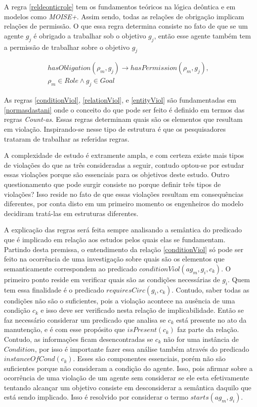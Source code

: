 A regra \ref{reldeonticrole} tem os fundamentos teóricos na lógica deôntica e em modelos como \textit{MOISE+}. Assim sendo, todas as relações de obrigação implicam relações de permissão. O que essa regra determina consiste no fato de que se um agente $g_j$ é obrigado a trabalhar sob o objetivo $g_j$, então esse agente também tem a permissão de trabalhar sobre o objetivo $g_j$ 

\begin{eqnarray}\label{reldeonticrole}
	hasObligation(\rho_m,g_j) \to hasPermission(\rho_m,g_j), \nonumber \\
    \rho_m \in Role \wedge g_j \in Goal
\end{eqnarray}

As regras \ref{conditionViol}, \ref{relationViol}, e \ref{entityViol} são fundamentadas em \ref{normasdastani} onde o conceito do que pode ser feito é definido em termos das regras \textit{Count-as}. Essas regras determinam quais são os elementos que resultam em violação. Inspirando-se nesse tipo de estrutura é que os pesquisadores trataram de trabalhar as referidas regras. 

A complexidade de estudo é extramente ampla, e com certeza existe mais tipos de violações do que as três consideradas a seguir, contudo optou-se por estudar essas violações porque são essenciais para os objetivos deste estudo. Outro questionamento que pode surgir consiste no porque definir três tipos de violações? Isso reside no fato de que essas violações resultam em consequências diferentes, por conta disto em um primeiro momento os engenheiros do modelo decidiram tratá-las em estruturas diferentes. 

A explicação das regras será feita sempre analisando a semântica do predicado que é implicado em relação aos estudos pelos quais elas se fundamentam. Partindo desta premissa, o entendimento da relação \ref{conditionViol} só pode ser feito na ocorrência de uma  investigação sobre quais são os elementos que semanticamente correspondem ao predicado $conditionViol(ag_m,g_i,c_k)$. O primeiro ponto reside em verificar quais são as condições necessárias de $g_i$. Quem tem essa finalidade é o predicado $requiresCirc(g_i,c_k)$. Contudo, saber todas as condições não são o suficientes, pois a violação acontece na ausência de uma condição $c_k$ e isso deve ser verificado nesta relação de implicabilidade. Então se faz necessário considerar um predicado que analisa se $c_k$ está presente no ato da manutenção, e é com esse propósito que $isPresent(c_k)$ faz parte da relação. Contudo, as informações ficam desencontradas se $c_k$ não for uma instância de $Condition$, por isso é importante fazer essa análise também através do predicado $instanceOfCond(c_k)$. Esses são componentes essenciais, porém não são suficientes porque não consideram a condição do agente. Isso, pois afirmar sobre a ocorrência de uma violação de um agente sem considerar se ele esta efetivamente tentando alcançar um objetivo consiste em desconsiderar a semântica daquilo que está sendo implicado. Isso é resolvido por considerar o termo  $starts(ag_m,g_i)$. 


